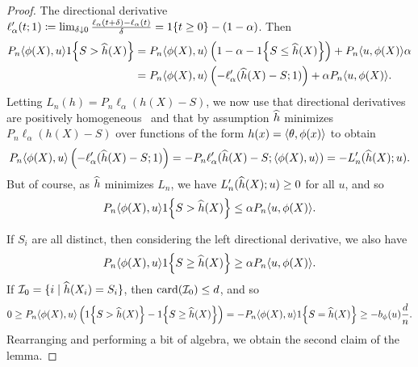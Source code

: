 \documentclass{article}
\newcommand{\radphi}{b_{\phi}}
\newcommand{\loss}{\ell}
\newcommand{\scorerv}{S}
\begin{document}
\begin{proof}
  The directional derivative
  $\loss'_\alpha(t; 1) \defeq \lim_{\delta \downarrow 0}
  \frac{\loss_\alpha(t + \delta) - \loss_\alpha(t)}{\delta}
  = \indic{t \ge 0} - (1 - \alpha)$.
  Then
  \begin{align*}
    P_n \<\phi(X), u\> \indic{\scorerv > \what{h}(X)}
    & = P_n\<\phi(X), u\>
    \left(1 - \alpha
    - \indic{\scorerv \le \what{h}(X)}\right)
    + P_n \<u, \phi(X)\> \alpha \\
    & = 
    P_n \<\phi(X), u\>
    \left(-\loss'_\alpha(\what{h}(X) - \scorerv; 1)\right)
    + \alpha P_n\<u, \phi(X)\>.
  \end{align*}
  Letting $L_n(h) = P_n \loss_\alpha(h(X) - \scorerv)$, we now use that
  directional derivatives are positively homogeneous~\cite{HiriartUrrutyLe93}
  and that by assumption $\widehat{h}$ minimizes
  $P_n \loss_\alpha(h(X) - \scorerv)$ over
  functions of the form $h(x) = \langle\theta, \phi(x)\rangle$ to obtain
  \begin{equation*}
    P_n \<\phi(X), u\>
    \left(-\loss'_\alpha(\what{h}(X) - \scorerv; 1)\right)
    = - P_n\loss'_\alpha(\what{h}(X) - \scorerv; \<\phi(X), u\>)
    = - L_n'(\what{h}(X); u).
  \end{equation*}
  But of course, as $\widehat{h}$ minimizes $L_n$,
  we have $L_n'(\widehat{h}(X); u) \ge 0$ for all $u$, and so
  \begin{equation*}
    P_n\<\phi(X), u\> \indic{\scorerv > \what{h}(X)}
    \le \alpha P_n \<u, \phi(X)\>.
  \end{equation*}

  If $\scorerv_i$ are all distinct, then considering the
  left directional derivative, we also have
  \begin{align*}
    P_n\<\phi(X), u\> \indic{\scorerv \ge \what{h}(X)} \ge
    \alpha P_n \<u, \phi(X)\>.
  \end{align*}
  If $\mc{I}_0 = \{i \mid \what{h}(X_i) = \scorerv_i\}$,
  then $\mathop{\rm card}(\mathcal{I}_0) \le d$, and so
  \begin{equation*}
    0 \ge P_n \<\phi(X), u\>
    \left(\indic{\scorerv > \what{h}(X)}
    - \indic{\scorerv \ge \what{h}(X)}\right)
    = -P_n \<\phi(X), u\> \indic{\scorerv = \what{h}(X)}
    \ge -\radphi(u) \frac{d}{n}.
  \end{equation*}
  Rearranging and performing a bit of algebra, we
  obtain the second claim of the lemma.
\end{proof}
\end{document}
